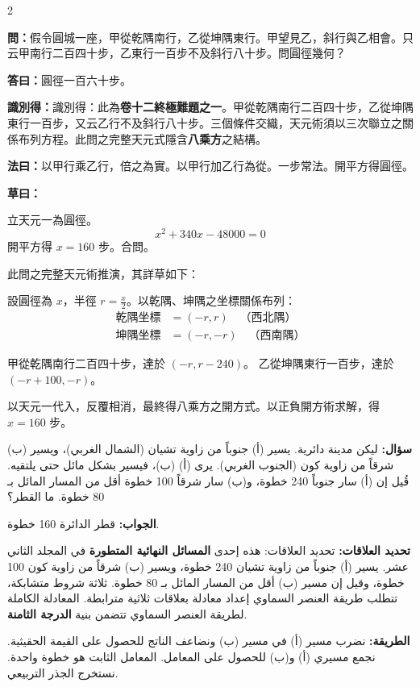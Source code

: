 \documentclass[11pt,a4paper]{article}
\newcommand{\ar}[1]{\arabicfont\beginR #1\endR}
\newcommand{\arb}[1]{\textbf{\arabicfont\beginR #1\endR}}
\newcommand{\arnote}[1]{\textcolor{arabicblue}{\ar{#1}}}
\newcommand{\wen}[1]{\par\noindent\textbf{\textcolor{probcolor}{問：}}{#1}\par}
\newcommand{\da}[1]{\par\noindent\textbf{\textcolor{anscolor}{答曰：}}{#1}\par}
\newcommand{\fayue}[1]{\par\noindent\textbf{\textcolor{methodcolor}{法曰：}}{#1}\par}
\newcommand{\caoyue}[1]{\par\noindent\textbf{草曰：}{#1}\par}
\newcommand{\zhi}[1]{\par\noindent\textbf{識別得：}{#1}\par}
\newcommand{\arwen}[1]{\par\noindent\arb{سؤال: }\arnote{#1}\par}
\newcommand{\arjwb}[1]{\par\noindent\arb{الجواب: }\arnote{#1}\par}
\newcommand{\arqwd}[1]{\par\noindent\arb{الطريقة: }\arnote{#1}\par}
\newcommand{\arfl}[1]{\par\noindent\arb{تحديد العلاقات: }\arnote{#1}\par}
\begin{document}
\begin{paracol}{2}

\begin{leftcolumn}
\wen{假令圓城一座，甲從乾隅南行，乙從坤隅東行。甲望見乙，斜行與乙相會。只云甲南行二百四十步，乙東行一百步不及斜行八十步。問圓徑幾何？}

\da{圓徑一百六十步。}

\zhi{識別得：此為\textbf{卷十二終極難題之一}。甲從乾隅南行二百四十步，乙從坤隅東行一百步，又云乙行不及斜行八十步。三個條件交織，天元術須以三次聯立之關係布列方程。此問之完整天元式隱含\textbf{八乘方}之結構。}

\fayue{以甲行乘乙行，倍之為實。以甲行加乙行為從。一步常法。開平方得圓徑。}

\caoyue{
立天元一為圓徑。
$$x^2 + 340x - 48000 = 0$$
開平方得 $x = 160$ 步。合問。

此問之完整天元術推演，其詳草如下：

設圓徑為 $x$，半徑 $r = \frac{x}{2}$。以乾隅、坤隅之坐標關係布列：
\begin{align*}
\text{乾隅坐標} &= (-r, r) \quad \text{（西北隅）} \\
\text{坤隅坐標} &= (-r, -r) \quad \text{（西南隅）}
\end{align*}

甲從乾隅南行二百四十步，達於 $(-r, r - 240)$。
乙從坤隅東行一百步，達於 $(-r + 100, -r)$。

以天元一代入，反覆相消，最終得八乘方之開方式。以正負開方術求解，得 $x = 160$ 步。}
\end{leftcolumn}

\begin{rightcolumn}
\arwen{ليكن مدينة دائرية. يسير (أ) جنوباً من زاوية تشيان (الشمال الغربي)، ويسير (ب) شرقاً من زاوية كون (الجنوب الغربي). يرى (أ) (ب)، فيسير بشكل مائل حتى يلتقيه. قُيل إن (أ) سار جنوباً 240 خطوة، و(ب) سار شرقاً 100 خطوة أقل من المسار المائل بـ 80 خطوة. ما القطر؟}

\arjwb{قطر الدائرة 160 خطوة.}

\arfl{تحديد العلاقات: هذه إحدى \textbf{المسائل النهائية المتطورة} في المجلد الثاني عشر. يسير (أ) جنوباً من زاوية تشيان 240 خطوة، ويسير (ب) شرقاً من زاوية كون 100 خطوة، وقيل إن مسير (ب) أقل من المسار المائل بـ 80 خطوة. ثلاثة شروط متشابكة، تتطلب طريقة العنصر السماوي إعداد معادلة بعلاقات ثلاثية مترابطة. المعادلة الكاملة لطريقة العنصر السماوي تتضمن بنية \textbf{الدرجة الثامنة}.}

\arqwd{نضرب مسير (أ) في مسير (ب) ونضاعف الناتج للحصول على القيمة الحقيثية. نجمع مسيري (أ) و(ب) للحصول على المعامل. المعامل الثابت هو خطوة واحدة. نستخرج الجذر التربيعي.}


\end{rightcolumn}
\end{paracol}
\end{document}
